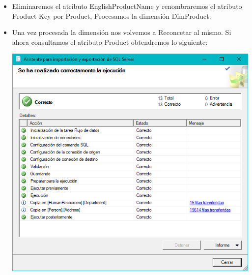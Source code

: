 \begin{itemize}
\item Eliminaremos el atributo EnglishProductName y renombraremos el atributo Product Key por Product, Procesamos la dimensión DimProduct.

\item Una vez procesada la dimensión nos volvemos a Reconcetar al mismo. Si ahora consultamos el atributo Product obtendremos lo siguiente:

	\begin{center}
	\includegraphics[width=\columnwidth]{./Imagenes/img3_3}
    \end{center}	



\end{itemize}
		